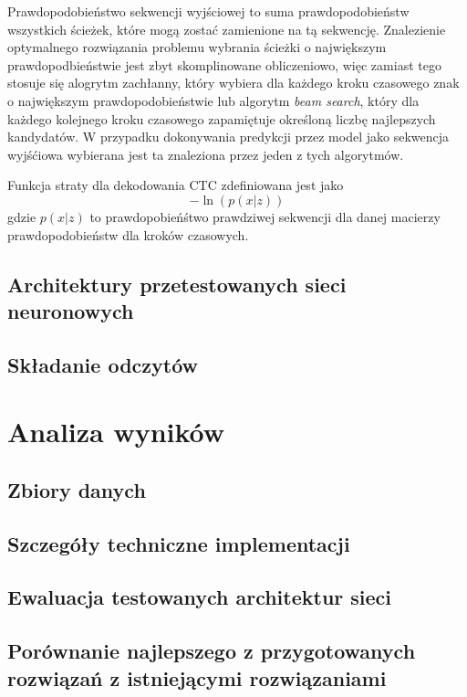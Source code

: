 \documentclass[a4paper,11pt,twoside]{report}
\theoremstyle{definition}
\begin{document}
Prawdopodobieństwo sekwencji wyjściowej to suma prawdopodobieństw wszystkich ścieżek, które mogą zostać zamienione na tą sekwencję. Znalezienie optymalnego rozwiązania problemu wybrania ścieżki o największym prawdopodbieństwie jest zbyt skomplinowane obliczeniowo, więc zamiast tego stosuje się alogrytm zachłanny, który wybiera dla każdego kroku czasowego znak o największym prawdopodobieństwie lub algorytm \textit{beam search}, który dla każdego kolejnego kroku czasowego zapamiętuje określoną liczbę najlepszych kandydatów. W przypadku dokonywania predykcji przez model jako sekwencja wyjśćiowa wybierana jest ta znaleziona przez jeden z tych algorytmów.

Funkcja straty dla dekodowania CTC zdefiniowana jest jako
\[-\ln{(p(x|z))}\]
gdzie $p(x|z)$ to prawdopobieńśtwo prawdziwej sekwencji dla danej macierzy prawdopodobieństw dla kroków czasowych.


\section*{Architektury przetestowanych sieci neuronowych}

\section*{Składanie odczytów}

\chapter*{Analiza wyników}

\section*{Zbiory danych}

\section*{Szczegóły techniczne implementacji}

\section*{Ewaluacja testowanych architektur sieci}

\section*{Porównanie najlepszego z przygotowanych rozwiązań z istniejącymi rozwiązaniami}
\end{document}
